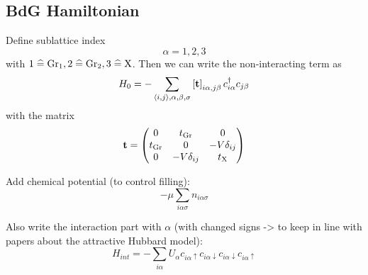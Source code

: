 \subsection{BdG Hamiltonian}

Define sublattice index
\begin{equation}
    \alpha = 1, 2, 3
\end{equation}
with \(1 \mathrel{\widehat{=}} \mathrm{Gr}_1, 2 \mathrel{\widehat{=}} \mathrm{Gr}_2, 3 \mathrel{\widehat{=}} \mathrm{X}\).
Then we can write the non-interacting term as
\begin{equation}
    H_0 = - \sum_{\langle i, j \rangle, \alpha, \beta, \sigma} \left[\textbf{t} \right]_{i\alpha,j\beta} c_{i\alpha}^{\dagger} c_{j\beta}
\end{equation}
with the matrix 
\begin{equation}
    \textbf{t} = \begin{pmatrix}
                  0 & t_{\mathrm{Gr}} & 0 \\
                  t_{\mathrm{Gr}} & 0 & -V \delta_{ij} \\
                  0 & -V \delta_{ij} & t_{\mathrm{X}} \\
    \end{pmatrix}
\end{equation}

Add chemical potential (to control filling):
\begin{equation}
    -\mu \sum_{i \alpha \sigma} n_{i \alpha \sigma}
\end{equation}

Also write the interaction part with \(\alpha\) (with changed signs -> to keep in line with papers about the attractive Hubbard model):
\begin{equation}
    H_{int} = - \sum_{i \alpha} U_{\alpha} c_{i\alpha \uparrow} c_{i\alpha \downarrow} c_{i\alpha \downarrow} c_{i\alpha \uparrow}
\end{equation}

